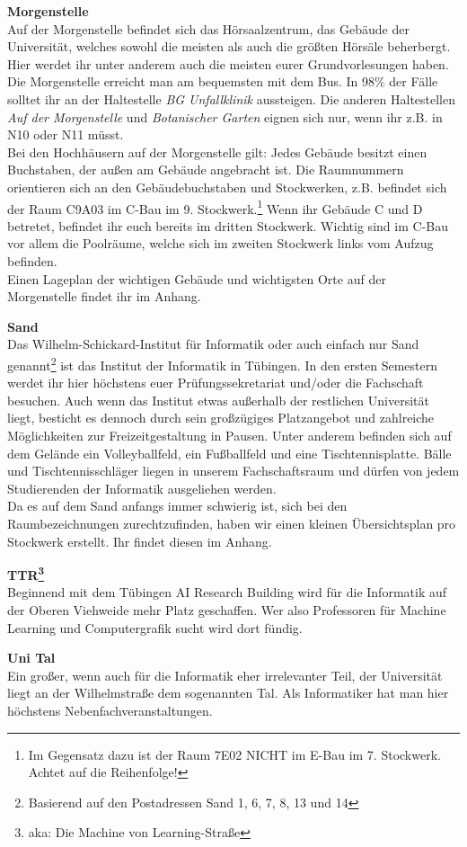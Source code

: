 \textbf{Morgenstelle}\\
Auf der Morgenstelle befindet sich das Hörsaalzentrum, das Gebäude der Universität, welches sowohl die meisten als auch die größten Hörsäle beherbergt. Hier werdet ihr unter anderem auch die meisten eurer Grundvorlesungen haben.\\
Die Morgenstelle erreicht man am bequemsten mit dem Bus. In 98\% der Fälle solltet ihr an der Haltestelle \emph{BG Unfallklinik} aussteigen. Die anderen Haltestellen \emph{Auf der Morgenstelle} und \emph{Botanischer Garten} eignen sich nur, wenn ihr z.B. in N10 oder N11 müsst.\\ Bei den Hochhäusern auf der Morgenstelle gilt: Jedes Gebäude besitzt einen Buchstaben, der außen am Gebäude angebracht ist.  Die Raumnummern orientieren sich an den Gebäudebuchstaben und Stockwerken, z.B. befindet sich der Raum C9A03 im C-Bau im 9. Stockwerk.\footnote{Im Gegensatz dazu ist der Raum 7E02 NICHT im E-Bau im 7. Stockwerk. Achtet auf die Reihenfolge!} Wenn ihr Gebäude C und D betretet, befindet ihr euch bereits im dritten Stockwerk. Wichtig sind im C-Bau vor allem die Poolräume, welche sich im zweiten Stockwerk links vom Aufzug befinden. \\
Einen Lageplan der wichtigen Gebäude und wichtigsten Orte auf der Morgenstelle findet ihr im Anhang.

\textbf{Sand}\\
Das Wilhelm-Schickard-Institut für Informatik oder auch einfach nur Sand genannt\footnote{Basierend auf den Postadressen Sand 1, 6, 7, 8, 13 und 14} ist das Institut der Informatik in Tübingen. In den ersten Semestern werdet ihr hier höchstens euer Prüfungssekretariat und/oder die Fachschaft besuchen. Auch wenn das Institut etwas außerhalb der restlichen Universität liegt, besticht es dennoch durch sein großzügiges Platzangebot und zahlreiche Möglichkeiten zur Freizeitgestaltung in Pausen. Unter anderem befinden sich auf dem Gelände ein Volleyballfeld, ein Fußballfeld und eine Tischtennisplatte. Bälle und Tischtennisschläger liegen in unserem Fachschaftsraum und dürfen von jedem Studierenden der Informatik ausgeliehen werden.\\
Da es auf dem Sand anfangs immer schwierig ist, sich bei den Raumbezeichnungen zurechtzufinden, haben wir einen kleinen Übersichtsplan pro Stockwerk erstellt. Ihr findet diesen im Anhang.

\textbf{TTR\footnote{aka: Die Machine von Learning-Straße}}\\
Beginnend mit dem Tübingen AI Research Building wird für die Informatik auf der Oberen Viehweide mehr Platz geschaffen. Wer also Professoren für Machine Learning und Computergrafik sucht wird dort fündig.

\textbf{Uni Tal}\\
Ein großer, wenn auch für die Informatik eher irrelevanter Teil, der Universität liegt an der Wilhelmstraße dem sogenannten Tal. Als Informatiker hat man hier höchstens Nebenfachveranstaltungen.
\vfill 
